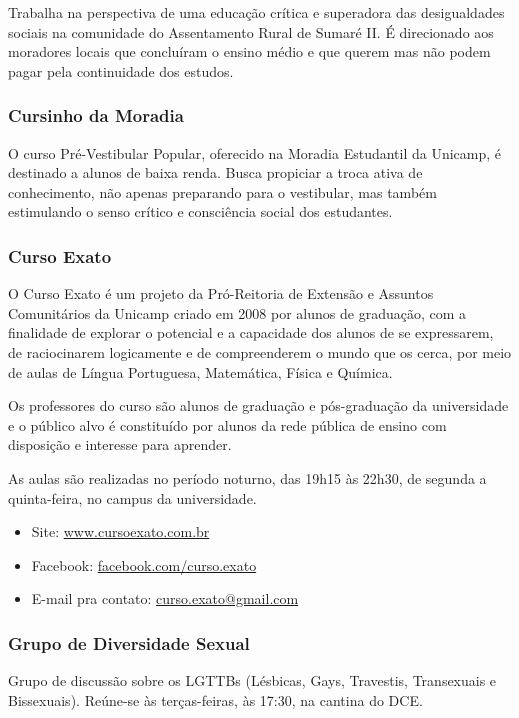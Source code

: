 Trabalha na perspectiva de uma educação crítica e superadora das desigualdades
sociais na comunidade do Assentamento Rural de Sumaré II. É direcionado aos
moradores locais que concluíram o ensino médio e que querem mas não podem pagar
pela continuidade dos estudos.

\subsubsection{Cursinho da Moradia}

O curso Pré-Vestibular Popular, oferecido na Moradia Estudantil da
Unicamp, é destinado a alunos de baixa renda. Busca propiciar a troca
ativa de conhecimento, não apenas preparando para o vestibular, mas
também estimulando o senso crítico e consciência social dos
estudantes.

\subsubsection{Curso Exato}

O Curso Exato é um projeto da Pró-Reitoria de Extensão e Assuntos Comunitários
da Unicamp criado em 2008 por alunos de graduação, com a finalidade de explorar
o potencial e a capacidade dos alunos de se expressarem, de raciocinarem
logicamente e de compreenderem o mundo que os cerca, por meio de aulas de Língua
Portuguesa, Matemática, Física e Química.

Os professores do curso são alunos de graduação e pós-graduação da universidade
e o público alvo é constituído por alunos da rede pública de ensino com
disposição e interesse para aprender.

As aulas são realizadas no período noturno, das 19h15 às 22h30, de segunda
a quinta-feira, no campus da universidade.

\begin{itemize}
\item Site: \url{www.cursoexato.com.br}
\item Facebook: \url{facebook.com/curso.exato}
\item E-mail pra contato: \url{curso.exato@gmail.com}
\end{itemize}

\subsubsection{Grupo de Diversidade Sexual}

Grupo de discussão sobre os LGTTBs (Lésbicas, Gays, Travestis, Transexuais
e Bissexuais). Reúne-se às terças-feiras, às 17:30, na cantina do DCE.

